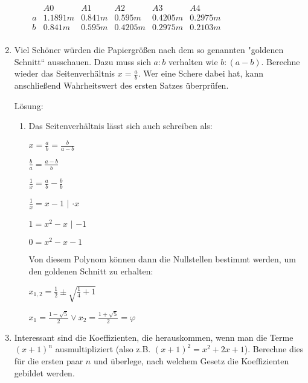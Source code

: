 \documentclass[../main.tex]{subfiles}
\begin{document}
\begin{enumerate}
\begin{enumerate}
		            \(
		            \begin{array}{cccccc}
			              & A0       & A1      & A2       & A3       & A4       \\
			            \hline
			            a & 1.1891 m & 0.841 m & 0.595 m  & 0.4205 m & 0.2975 m \\
			            b & 0.841 m  & 0.595 m & 0.4205 m & 0.2975 m & 0.2103 m \\
		            \end{array}
		            \)
	      \end{enumerate}
	\item Viel Schöner würden die Papiergrößen nach dem so genannten "goldenen Schnitt“ ausschauen.
	      Dazu muss sich \(
	      a : b
	      \) verhalten wie \(
	      b : (a - b)
	      \). Berechne wieder das Seitenverhältnis \(
	      x = \frac{a}{b}
	      \). Wer eine Schere dabei hat,
	      kann anschließend Wahrheitswert des ersten Satzes überprüfen.

	      Lösung:
	      \begin{enumerate}
		      \item Das Seitenverhältnis lässt sich auch schreiben als:

		            \(
		            x
		            = \frac{a}{b}
		            = \frac{b}{a-b}
		            \)

		            \(
		            \frac{b}{a}
		            = \frac{a-b}{b}
		            \)

		            \(
		            \frac{1}{x}
		            = \frac{a}{b} - \frac{b}{b}
		            \)

		            \(
		            \frac{1}{x}
		            = x - 1
		            \)
		            \(|\) \(
		            \cdot x
		            \)

		            \(
		            1
		            = x^2 - x
		            \)
		            \(|\) \(
		            -1
		            \)

		            \(
		            0 = x^2 - x - 1
		            \)

		            Von diesem Polynom können dann die Nullstellen bestimmt werden, um den goldenen Schnitt zu erhalten:

		            \(
		            x_{1,2} = \frac{1}{2} \pm \sqrt{
			            \frac{1}{4} + 1
		            }
		            \)

		            \(
		            x_1 = \frac{1 - \sqrt{5}}{2} \lor
		            x_2 = \frac{1 + \sqrt{5}}{2} = \varphi
		            \)
	      \end{enumerate}
	\item Interessant sind die Koeffizienten, die herauskommen, wenn man die Terme \(
	      (x + 1)^n
	      \) ausmultipliziert (also z.B. \(
	      (x + 1)^2 = x^2 + 2x + 1
	      \)).
	      Berechne dies für die ersten paar \(
	      n
	      \) und überlege, nach welchem Gesetz die Koeffizienten gebildet werden.


\end{enumerate}
\end{document}
